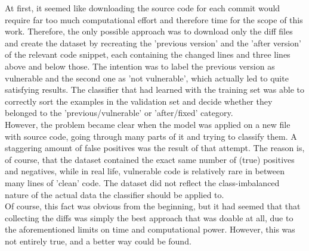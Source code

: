 \documentclass[
a4paper,
pagesize,
pdftex,
12pt,
ngerman,
fleqn,
final,
]{scrartcl}
\begin{document}
	At first, it seemed like downloading the source code for each commit would require far too much computational effort and therefore time for the scope of this work. Therefore, the only possible approach was to download only the diff files and create the dataset by recreating the 'previous version' and the 'after version' of the relevant code snippet, each containing the changed lines and three lines above and below those. The intention was to label the previous version as vulnerable and the second one as 'not vulnerable', which actually led to quite satisfying results. The classifier that had learned with the training set was able to correctly sort the examples in the validation set and decide whether they belonged to the 'previous/vulnerable' or 'after/fixed' category.\\
	However, the problem became clear when the model was applied on a new file with source code, going through many parts of it and trying to classify them. A staggering amount of false positives was the result of that attempt. The reason is, of course, that the dataset contained the exact same number of (true) positives and negatives, while in real life, vulnerable code is relatively rare in between many lines of 'clean' code. The dataset did not reflect the class-imbalanced nature of the actual data the classifier should be applied to.\\
	Of course, this fact was obvious from the beginning, but it had seemed that that collecting the diffs was simply the best approach that was doable at all, due to the aforementioned limits on time and computational power. However, this was not entirely true, and a better way could be found.
		
\end{document}
